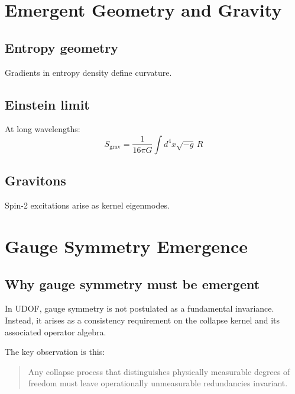 \documentclass[11pt]{book}
\begin{document}
\chapter{Emergent Geometry and Gravity}

\section{Entropy geometry}

Gradients in entropy density define curvature.

\section{Einstein limit}

At long wavelengths:
\begin{equation}
S_{\mathrm{grav}}
=
\frac{1}{16\pi G}\int d^4x\sqrt{-g}\,R
\end{equation}

\section{Gravitons}

Spin-2 excitations arise as kernel eigenmodes.

\chapter{Gauge Symmetry Emergence}

\section{Why gauge symmetry must be emergent}

In UDOF, gauge symmetry is not postulated as a fundamental invariance.
Instead, it arises as a consistency requirement on the collapse kernel
and its associated operator algebra.

The key observation is this:

\begin{quote}
Any collapse process that distinguishes physically measurable degrees
of freedom must leave operationally unmeasurable redundancies invariant.
\end{quote}
\end{document}
